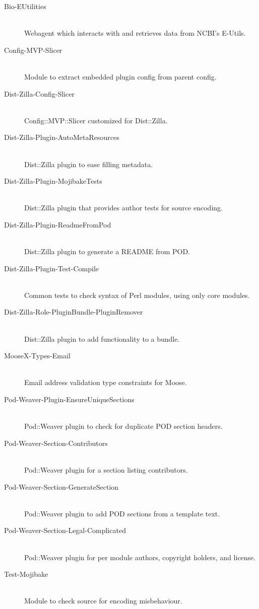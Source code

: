 \begin{table}
  \label{tab:software:debian-packages}
  \begin{description}
  \item[Bio-EUtilities] \hfill \\
    Webagent which interacts with and retrieves data from NCBI's E-Utils.
  \item[Config-MVP-Slicer] \hfill \\
    Module to extract embedded plugin config from parent config.
  \item[Dist-Zilla-Config-Slicer] \hfill \\
    Config::MVP::Slicer customized for Dist::Zilla.
  \item[Dist-Zilla-Plugin-AutoMetaResources] \hfill \\
    Dist::Zilla plugin to ease filling  metadata.
  \item[Dist-Zilla-Plugin-MojibakeTests] \hfill \\
    Dist::Zilla plugin that provides author tests for source encoding.
  \item[Dist-Zilla-Plugin-ReadmeFromPod] \hfill \\
    Dist::Zilla plugin to generate a README from POD.
  \item[Dist-Zilla-Plugin-Test-Compile] \hfill \\
    Common tests to check syntax of Perl modules, using only core modules.
  \item[Dist-Zilla-Role-PluginBundle-PluginRemover] \hfill \\
    Dist::Zilla plugin to add  functionality to a bundle.
  \item[MooseX-Types-Email] \hfill \\
    Email address validation type constraints for Moose.
  \item[Pod-Weaver-Plugin-EnsureUniqueSections] \hfill \\
    Pod::Weaver plugin to check for duplicate POD section headers.
  \item[Pod-Weaver-Section-Contributors] \hfill \\
    Pod::Weaver plugin for a section listing contributors.
  \item[Pod-Weaver-Section-GenerateSection] \hfill \\
    Pod::Weaver plugin to add POD sections from a template text.
  \item[Pod-Weaver-Section-Legal-Complicated] \hfill \\
    Pod::Weaver plugin for per module authors, copyright holders, and license.
  \item[Test-Mojibake] \hfill \\
    Module to check source for encoding misbehaviour.
  \end{description}
\end{table}

